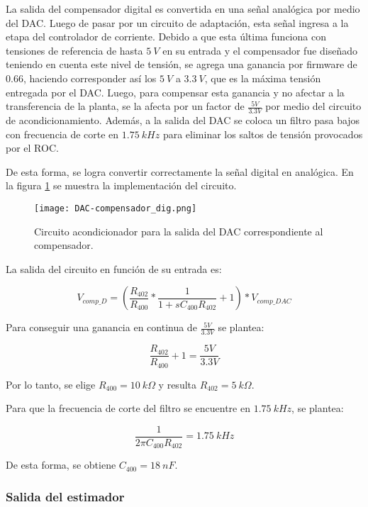 La salida del compensador digital es convertida en una señal analógica por medio del DAC. Luego de pasar por un circuito de adaptación, esta señal ingresa a la etapa del controlador de corriente. Debido a que esta última funciona con tensiones de referencia de hasta $5\:V$ en su entrada y el compensador fue diseñado teniendo en cuenta este nivel de tensión, se agrega una ganancia por firmware de $0.66$, haciendo corresponder así los $5\:V$ a $3.3\:V$, que es la máxima tensión entregada por el DAC. Luego, para compensar esta ganancia y no afectar a la transferencia de la planta, se la afecta por un factor de $\frac{5V}{3.3V}$ por medio del circuito de acondicionamiento. Además, a la salida del DAC se coloca un filtro pasa bajos con frecuencia de corte en $1.75\:kHz$ para eliminar los saltos de tensión provocados por el ROC.

De esta forma, se logra convertir correctamente la señal digital en analógica. En la figura \ref{fig:DAC-compensador} se muestra la implementación del circuito.

\begin{figure}[H]
	\centering
	\texttt{[image: DAC-compensador\_dig.png]}
	\caption{Circuito acondicionador para la salida del DAC correspondiente al compensador.}
	\label{fig:DAC-compensador}
\end{figure}

La salida del circuito en función de su entrada es:

\begin{equation*} 
	V_{comp\_D}=(\frac{R_{402}}{R_{400}} *\frac{1}{1+sC_{400}R_{402}}+1)*V_{comp\_DAC}
\end{equation*}

Para conseguir una ganancia en continua de  $\frac{5V}{3.3V}$ se plantea:

\begin{equation*} 
	\frac{R_{402}}{R_{400}} +1 = \frac{5V}{3.3V}
\end{equation*}

Por lo tanto, se elige $R_{400}=10\:k\Omega$ y resulta $R_{402}=5\:k\Omega$. 

Para que la frecuencia de corte del filtro se encuentre en $1.75\:kHz$, se plantea:

\begin{equation*} 
	\frac{1}{2\pi C_{400}R_{402}}=1.75\:kHz
\end{equation*}

De esta forma, se obtiene $C_{400}=18\:nF$. 


\subsubsection{Salida del estimador}

